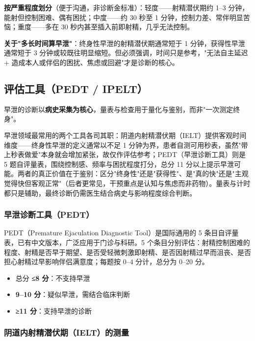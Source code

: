 \noindent\textbf{按严重程度划分}（便于沟通，非诊断金标准）：轻度——射精潜伏期约 1--3 分钟，能射但控制困难、偶有困扰；中度——约 30 秒至 1 分钟，控制力差、常伴明显苦恼；重度——多在 30 秒内甚至插入前即射精，几乎无法控制。

\noindent\textbf{关于"多长时间算早泄"}：终身性早泄的射精潜伏期通常短于 1 分钟，获得性早泄通常短于 3 分钟或较既往明显缩短。但必须强调，时间只是参考，"无法自主延迟 + 造成本人或伴侣的困扰、焦虑或回避"才是诊断的核心。

\subsection{评估工具（PEDT / IPELT）}

早泄的诊断以\textbf{病史采集为核心}，量表与检查用于量化与鉴别，而非"一次测定终身"。


早泄领域最常用的两个工具各司其职：阴道内射精潜伏期（IELT）提供客观时间维度——终身性早泄的定义通常以不足 1 分钟为界，患者自测可用秒表，虽然"带上秒表做爱"本身就会增加紧张，故仅作评估参考；PEDT（早泄诊断工具）则是 5 题自评量表，围绕控制感、频率与困扰程度打分，总分 11 分以上提示早泄可能。两者的真正价值在于鉴别：区分"终身性"还是"获得性"、是"真的快"还是"主观觉得快但客观正常"（后者更常见，干预重点是认知与焦虑而非药物）。量表与计时都只是辅助，最终诊断仍需医生结合病史与影响程度综合判断。

\subsubsection{早泄诊断工具（PEDT）}

PEDT（Premature Ejaculation Diagnostic Tool）是国际通用的 5 条目自评量表，已有中文版本，广泛应用于门诊与科研。5 个条目分别评估：射精控制困难的程度、射精是否早于期望、是否受轻微刺激即射精、是否因射精过早而沮丧、是否担心射精过早影响伴侣满意度；每题按 0--4 分计，总分为 0--20 分。

\begin{itemize}
	\item 总分 \textbf{≤8 分}：不支持早泄
	\item \textbf{9--10 分}：疑似早泄，需结合临床判断
	\item \textbf{≥11 分}：支持早泄的诊断
\end{itemize}

\subsubsection{阴道内射精潜伏期（IELT）的测量}

